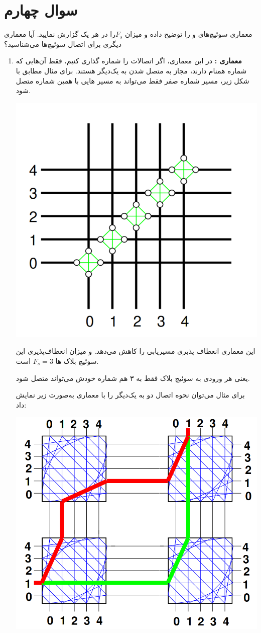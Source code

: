 \section{سوال چهارم}
معماری سوئیچ‌های  و  را توضیح داده و میزان $F_s$​ را در هر یک گزارش نمایید. آیا معماری دیگری برای اتصال سوئیچ‌ها می‌شناسید؟

\begin{qsolve}
	
	\begin{enumerate}
		\item 
		\textbf{معماری :}
		در این معماری، اگر 	اتصالات را شماره گذاری کنیم، فقط آن‌هایی که شماره همنام دارند، مجاز به متصل شدن به یک‌دیگر هستند. برای مثال مطابق با شکل زیر، مسیر شماره صفر فقط می‌تواند به مسیر هایی با همین شماره متصل شود.
		
		\begin{center}
			\includegraphics*[width=0.4\linewidth]{pics/Q4.png}
			\label{معماری سوییچ دیسجوینت}
		\end{center}
		
		این معماری انعطاف پذبری مسیریابی را کاهش می‌دهد. و میزان انعطاف‌پذیری این سوئیچ بلاک ها $F_s=3$ است.
		
		
		
		یعنی هر  ورودی به سوئیچ بلاک فقط به ۳  هم شماره خودش می‌تواند متصل شود.
		
		
		برای مثال می‌توان نحوه اتصال دو  به یک‌دیگر را با معماری  به‌صورت زیر نمایش داد:
		
		\begin{center}
			\includegraphics*[width=0.5\linewidth]{pics/Q7.png}
			\label{اتصال۱}
		\end{center}
		

	\end{enumerate}
\end{qsolve}


